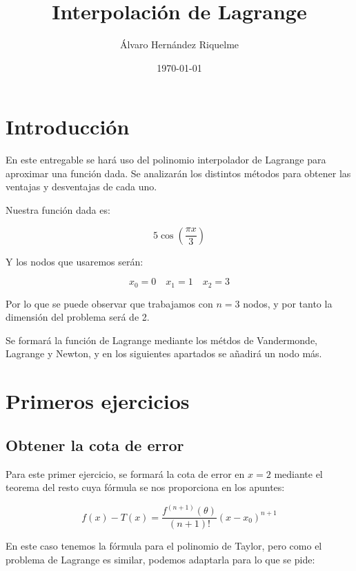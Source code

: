 \documentclass{article}
\title{Interpolación de Lagrange}
\author{Álvaro Hernández Riquelme}
\date{\today}
\begin{document}

\maketitle
\tableofcontents
\newpage

\section{Introducción}

En este entregable se hará uso del polinomio interpolador de Lagrange para aproximar una función dada. Se analizarán los distintos métodos para obtener las ventajas y desventajas de cada uno.

Nuestra función dada es:

\begin{equation}\label{funcion2}
	5 \cos \left( \frac{\pi x}{3} \right)
\end{equation}

Y los nodos que usaremos serán:

\begin {equation}\label{nodos}
x_{0} = 0 \quad x_{1} = 1 \quad x_{2} = 3
\end{equation}

Por lo que se puede observar que trabajamos con $n = 3$ nodos, y por tanto la dimensión del problema será de 2.

Se formará la función de Lagrange mediante los métdos de Vandermonde, Lagrange y Newton, y en los siguientes apartados se añadirá un nodo más.

\section{Primeros ejercicios}

\subsection{Obtener la cota de error}

Para este primer ejercicio, se formará la cota de error en $x=2$ mediante el teorema del resto cuya fórmula se nos proporciona en los apuntes:

\begin{equation}
	f(x) - T(x) = \frac{f^{(n+1)}(\theta)}{(n+1)!}(x-x_0)^{n+1}
\end{equation}

En este caso tenemos la fórmula para el polinomio de Taylor, pero como el problema de Lagrange es similar, podemos adaptarla para lo que se pide:
\end{document}
